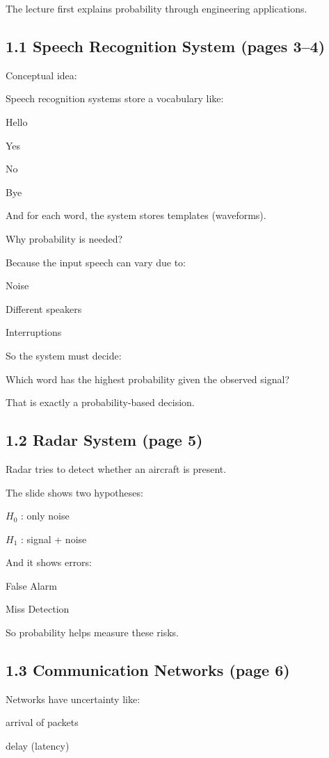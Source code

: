 \documentclass[12pt,a4paper]{article}
\begin{document}
The lecture first explains probability through engineering applications.

\subsection*{1.1 Speech Recognition System (pages 3–4)}

Conceptual idea:

Speech recognition systems store a vocabulary like:

Hello

Yes

No

Bye

And for each word, the system stores templates (waveforms).

Why probability is needed?

Because the input speech can vary due to:

Noise

Different speakers

Interruptions

So the system must decide:

Which word has the highest probability given the observed signal?

That is exactly a probability-based decision.

\subsection*{1.2 Radar System (page 5)}

Radar tries to detect whether an aircraft is present.

The slide shows two hypotheses:

$H_0$ : only noise

$H_1$ : signal + noise

And it shows errors:

False Alarm

Miss Detection

So probability helps measure these risks.

\subsection*{1.3 Communication Networks (page 6)}

Networks have uncertainty like:

arrival of packets

delay (latency)
\end{document}
